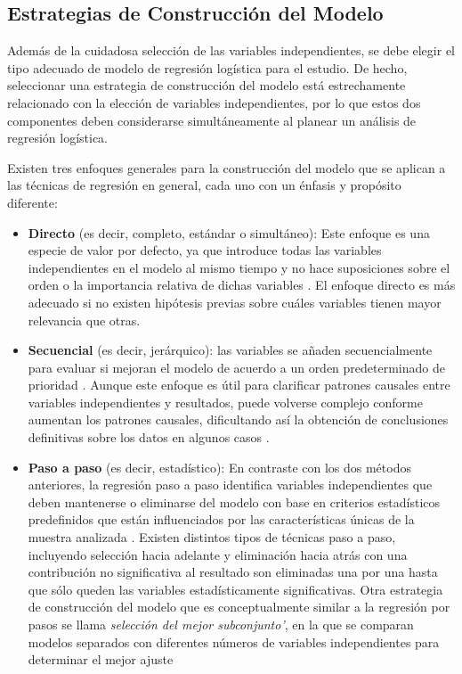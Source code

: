 \documentclass[12pt]{article}
\begin{document}
\subsection{Estrategias de Construcci\'on del Modelo}

Adem\'as de la cuidadosa selecci\'on de las variables independientes, se debe elegir el tipo adecuado de modelo de regresi\'on log\'istica para el estudio. De hecho, seleccionar una estrategia de construcci\'on del modelo est\'a estrechamente relacionado con la elecci\'on de variables independientes, por lo que estos dos componentes deben considerarse simult\'aneamente al planear un an\'alisis de regresi\'on log\'istica.

Existen tres enfoques generales para la construcci\'on del modelo que se aplican a las t\'ecnicas de regresi\'on en general, cada uno con un \'enfasis y prop\'osito diferente: 
\begin{itemize}
\item \textbf{Directo} (es decir, completo, est\'andar o simult\'aneo): Este enfoque es una especie de valor por defecto, ya que introduce todas las variables independientes en el modelo al mismo tiempo y no hace suposiciones sobre el orden o la importancia relativa de dichas variables \cite{darlington1990,tabachnick2007}. El enfoque directo es m\'as adecuado si no existen hip\'otesis previas sobre cu\'ales variables tienen mayor relevancia que otras. 

\item \textbf{Secuencial} (es decir, jer\'arquico):  las variables se a\~naden secuencialmente para evaluar si mejoran el modelo de acuerdo a un orden predeterminado de prioridad \cite{darlington1990,tabachnick2007}. Aunque este enfoque es \'util para clarificar patrones causales entre variables independientes y resultados, puede volverse complejo conforme aumentan los patrones causales, dificultando as\'i la obtenci\'on de conclusiones definitivas sobre los datos en algunos casos \cite{darlington1990}.

\item \textbf{Paso a paso} (es decir, estad\'istico): En contraste con los dos m\'etodos anteriores, la regresi\'on paso a paso identifica variables independientes que deben mantenerse o eliminarse del modelo con base en criterios estad\'isticos predefinidos que est\'an influenciados por las caracter\'isticas \'unicas de la muestra analizada \cite{tabachnick2007,hosmer2000}. Existen distintos tipos de t\'ecnicas paso a paso, incluyendo selecci\'on hacia adelante y eliminaci\'on hacia atr\'as con una contribuci\'on no significativa al resultado son eliminadas una por una hasta que s\'olo queden las variables estad\'isticamente significativas.\cite{darlington1990, hosmer2000} Otra estrategia de construcci\'on del modelo que es conceptualmente similar a la regresi\'on por pasos se llama \textit{selecci\'on del mejor subconjunto'}, en la que se comparan modelos separados con diferentes n\'umeros de variables independientes para determinar el mejor ajuste \cite{hosmer2000}
\end{itemize}
\end{document}
